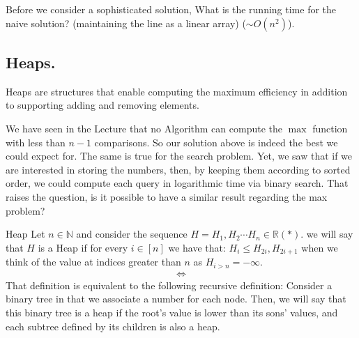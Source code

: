 Before we consider a sophisticated solution, What is the running time for the naive solution? (maintaining the line as a linear array) ($\sim O\left( n^2 \right)$).
\subsection*{Heaps.} Heaps are structures that enable computing the maximum efficiency in addition to supporting adding and removing elements.

We have seen in the Lecture that no Algorithm can compute the $\max$ function with less than $n-1$ comparisons. So our solution above is indeed the best we could expect for. The same is true for the search problem. Yet, we saw that if we are interested in storing the numbers, then, by keeping them according to sorted order, we could compute each query in logarithmic time via binary search. That raises the question, is it possible to have a similar result regarding the max problem?

\begin{defbox}{Heap}
  Let $n \in \mathbb{N}$ and consider the sequence $H = H_{1}, H_{2} \cdots H_{n} \in \mathbb{R} \left( * \right)$. we will say that $H$ is a Heap if for every $i \in [n]$ we have that: $H_{i} \le H_{2i}, H_{2i + 1}$ when we think of the value at indices greater than $n$ as $H_{i>n} = -\infty$. 
  \begin{equation*}
    \begin{split}
      \Leftrightarrow
    \end{split}
  \end{equation*}
  That definition is equivalent to the following recursive definition: Consider a binary tree in that we associate a number for each node. Then, we will say that this binary tree is a heap if the root's value is lower than its sons' values, and each subtree defined by its children is also a heap. 
\end{defbox}


